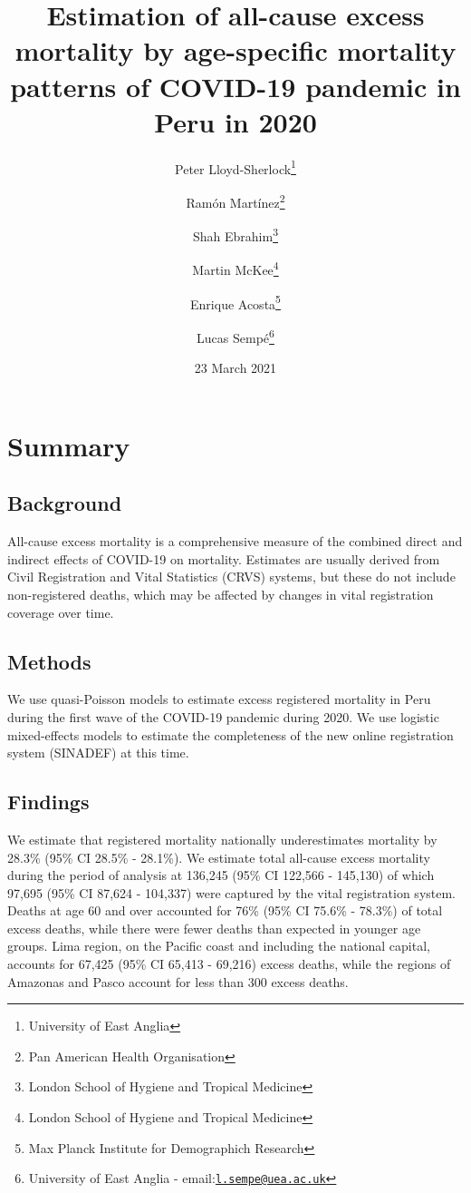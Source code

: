 \documentclass[
]{article}
\title{Estimation of all-cause excess mortality by age-specific mortality patterns of COVID-19 pandemic in Peru in 2020}
\author{Peter Lloyd-Sherlock\footnote{University of East Anglia} \and Ramón Martínez\footnote{Pan American Health Organisation} \and Shah Ebrahim\footnote{London School of Hygiene and Tropical Medicine} \and Martin McKee\footnote{London School of Hygiene and Tropical Medicine} \and Enrique Acosta\footnote{Max Planck Institute for Demographich Research} \and Lucas Sempé\footnote{University of East Anglia - email:\href{mailto:l.sempe@uea.ac.uk}{\nolinkurl{l.sempe@uea.ac.uk}}}}
\date{23 March 2021}
\begin{document}
\maketitle

\hypertarget{summary}{%
\section*{Summary}\label{summary}}

\hypertarget{background}{%
\subsection*{Background}\label{background}}

All-cause excess mortality is a comprehensive measure of the combined direct and indirect effects of COVID-19 on mortality. Estimates are usually derived from Civil Registration and Vital Statistics (CRVS) systems, but these do not include non-registered deaths, which may be affected by changes in vital registration coverage over time.

\hypertarget{methods}{%
\subsection*{Methods}\label{methods}}

We use quasi-Poisson models to estimate excess registered mortality in Peru during the first wave of the COVID-19 pandemic during 2020. We use logistic mixed-effects models to estimate the completeness of the new online registration system (SINADEF) at this time.

\hypertarget{findings}{%
\subsection*{Findings}\label{findings}}

We estimate that registered mortality nationally underestimates mortality by 28.3\% (95\% CI 28.5\% - 28.1\%). We estimate total all-cause excess mortality during the period of analysis at 136,245 (95\% CI 122,566 - 145,130) of which 97,695 (95\% CI 87,624 - 104,337) were captured by the vital registration system. Deaths at age 60 and over accounted for 76\% (95\% CI 75.6\% - 78.3\%) of total excess deaths, while there were fewer deaths than expected in younger age groups. Lima region, on the Pacific coast and including the national capital, accounts for 67,425 (95\% CI 65,413 - 69,216) excess deaths, while the regions of Amazonas and Pasco account for less than 300 excess deaths.
\end{document}
